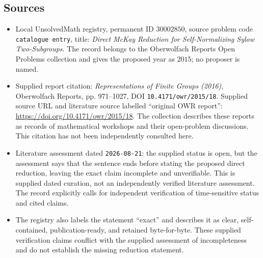 \documentclass[11pt]{article}
\begin{document}
\subsection{Sources}
\begin{itemize}
\item Local UnsolvedMath registry, permanent ID \(30002850\), source problem code \texttt{catalogue entry}, title: \emph{Direct McKay Reduction for Self-Normalizing Sylow Two-Subgroups}. The record belongs to the Oberwolfach Reports Open Problems collection and gives the proposed year as \(2015\); no proposer is named.
\item Supplied report citation: \emph{Representations of Finite Groups (2016)}, Oberwolfach Reports, pp. 971--1027, DOI \texttt{10.4171/owr/2015/18}. Supplied source URL and literature source labelled ``original OWR report'': \url{https://doi.org/10.4171/owr/2015/18}. The collection describes these reports as records of mathematical workshops and their open-problem discussions. This citation has not been independently consulted here.
\item Literature assessment dated \texttt{2026-08-21}: the supplied status is open, but the assessment says that the sentence ends before stating the proposed direct reduction, leaving the exact claim incomplete and unverifiable. This is supplied dated curation, not an independently verified literature assessment. The record explicitly calls for independent verification of time-sensitive status and cited claims.
\item The registry also labels the statement ``exact'' and describes it as clear, self-contained, publication-ready, and retained byte-for-byte. These supplied verification claims conflict with the supplied assessment of incompleteness and do not establish the missing reduction statement.
\end{itemize}
\end{document}
